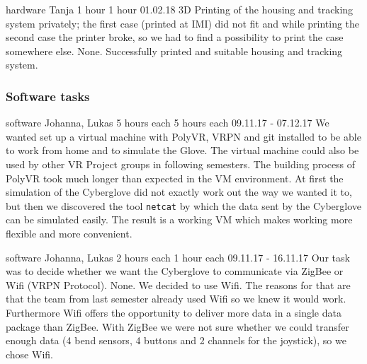 	{hardware}%
	{Tanja}%
	{1 hour}%
	{1 hour}%
	{01.02.18}%
	{3D Printing of the housing and tracking system privately; the first case (printed at IMI) did not fit and while printing the second case the printer broke, so we had to find a possibility to print the case somewhere else.}%
	{None.}%
	{Successfully printed and suitable housing and tracking system.}%


\subsubsection{Software tasks}
	{software}%
	{Johanna, Lukas}%
	{5 hours each}%
	{5 hours each}%
	{09.11.17 - 07.12.17}%
	{We wanted set up a virtual machine with PolyVR, VRPN and git installed to be able to work from home and to simulate the Glove. The virtual machine could also be used by other VR Project groups in following semesters.}%
	{The building process of PolyVR took much longer than expected in the VM environment. At first the simulation of the Cyberglove did not exactly work out the way we wanted it to, but then we discovered the tool \texttt{netcat} by which the data sent by the Cyberglove can be simulated easily.}%
	{The result is a working VM which makes working more flexible and more convenient.}%

	{software}%
	{Johanna, Lukas}%
	{2 hours each}%
	{1 hour each}%
	{09.11.17 - 16.11.17}%
	{Our task was to decide whether we want the Cyberglove to communicate via ZigBee or Wifi (VRPN Protocol). }%
	{None.}%
	{We decided to use Wifi. The reasons for that are that the team from last semester already used Wifi so we knew it would work. Furthermore Wifi offers the opportunity to deliver more data in a single data package than ZigBee. With ZigBee we were not sure whether we could transfer enough data (4 bend sensors, 4 buttons and 2 channels for the joystick), so we  chose Wifi. }%
	
